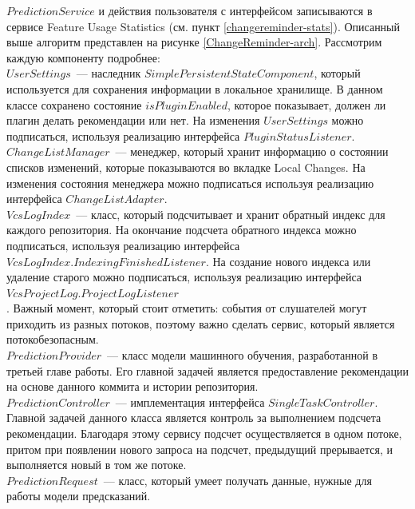     
$PredictionService$ и действия пользователя с интерфейсом записываются в сервисе Feature Usage Statistics (см. пункт \ref{changereminder-stats}). Описанный выше алгоритм представлен на рисунке \ref{ChangeReminder-arch}. Рассмотрим каждую компоненту подробнее:\\


$UserSettings$~--- наследник $SimplePersistentStateComponent$, который используется для сохранения информации в локальное хранилище. В данном классе сохранено состояние $isPluginEnabled$, которое показывает, должен ли плагин делать рекомендации или нет. На изменения $UserSettings$ можно подписаться, используя реализацию интерфейса $PluginStatusListener$.\\


$ChangeListManager$~--- менеджер, который хранит информацию о состоянии списков изменений, которые показываются во вкладке Local Changes. На изменения состояния менеджера можно подписаться используя реализацию интерфейса $ChangeListAdapter$.\\


$VcsLogIndex$~--- класс, который подсчитывает и хранит обратный индекс для каждого репозитория. На окончание подсчета обратного индекса можно подписаться, используя реализацию интерфейса $VcsLogIndex.IndexingFinishedListener$. На создание нового индекса или удаление старого можно подписаться, используя реализацию интерфейса $VcsProjectLog.ProjectLogListener$\\. Важный момент, который стоит отметить: события от слушателей могут приходить из разных потоков, поэтому важно сделать сервис, который является потокобезопасным.\\


$PredictionProvider$~--- класс модели машинного обучения, разработанной в третьей главе работы. Его главной задачей является предоставление рекомендации на основе данного коммита и истории репозитория.\\


$PredictionController$~--- имплементация интерфейса $SingleTaskController$. Главной задачей данного класса является контроль за выполнением подсчета рекомендации. Благодаря этому сервису подсчет осуществляется в одном потоке, притом при появлении нового запроса на подсчет, предыдущий прерывается, и выполняется новый в том же потоке.\\


$PredictionRequest$~--- класс, который умеет получать данные, нужные для работы модели предсказаний. \\


